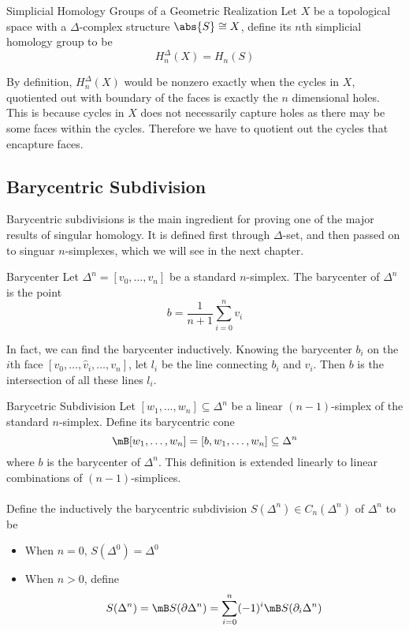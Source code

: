 \documentclass[a4paper]{article}
\begin{document}
\begin{defn}{Simplicial Homology Groups of a Geometric Realization}{} Let $X$ be a topological space with a $\Delta$-complex structure $\abs{S}\cong X$, define its $n$th simplicial homology group to be $$H_n^\Delta(X)=H_n(S)$$
\end{defn}

By definition, $H_n^\Delta(X)$ would be nonzero exactly when the cycles in $X$, quotiented out with boundary of the faces is exactly the $n$ dimensional holes. This is because cycles in $X$ does not necessarily capture holes as there may be some faces within the cycles. Therefore we have to quotient out the cycles that encapture faces. 

\subsection{Barycentric Subdivision}
Barycentric subdivisions is the main ingredient for proving one of the major results of singular homology. It is defined first through $\Delta$-set, and then passed on to singuar $n$-simplexes, which we will see in the next chapter. 

\begin{defn}{Barycenter}{} Let $\Delta^n=[v_0,\dots,v_n]$ be a standard $n$-simplex. The barycenter of $\Delta^n$ is the point $$b=\frac{1}{n+1}\sum_{i=0}^nv_i$$
\end{defn}

In fact, we can find the barycenter inductively. Knowing the barycenter $b_i$ on the $i$th face $[v_0,\dots,\hat{v}_i,\dots,v_n]$, let $l_i$ be the line connecting $b_i$ and $v_i$. Then $b$ is the intersection of all these lines $l_i$. 

\begin{defn}{Barycetric Subdivision}{} Let $[w_1,\dots,w_n]\subseteq\Delta^n$ be a linear $(n-1)$-simplex of the standard $n$-simplex. Define its barycentric cone $$\mB[w_1,\dots,w_n]=[b,w_1,\dots,w_n]\subseteq\Delta^n$$ where $b$ is the barycenter of $\Delta^n$. This definition is extended linearly to linear combinations of $(n-1)$-simplices. \\~\\
Define the inductively the barycentric subdivision $S(\Delta^n)\in C_n(\Delta^n)$ of $\Delta^n$ to be
\begin{itemize}
\item When $n=0$, $S(\Delta^0)=\Delta^0$
\item When $n>0$, define $$S(\Delta^n)=\mB S(\partial\Delta^n)=\sum_{i=0}^n(-1)^i\mB S(\partial_i\Delta^n)$$
\end{itemize}
\end{defn}
\end{document}
